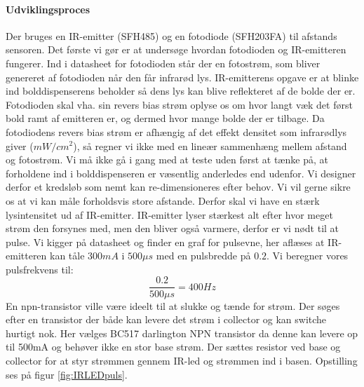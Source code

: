 \documentclass[Rapport/Rapport_main.tex]{subfiles}
\begin{document}
\paragraph{Udviklingsproces}
\newline\newline
Der bruges en IR-emitter (SFH485) og en fotodiode (SFH203FA) til afstands sensoren. Det første vi gør er at undersøge hvordan fotodioden og IR-emitteren fungerer. Ind i datasheet for fotodioden står der en fotostrøm, som bliver genereret af fotodioden når den får infrarød lys. IR-emitterens opgave er at blinke ind bolddispenserens beholder så dens lys kan blive reflekteret af de bolde der er. Fotodioden skal vha. sin revers bias strøm oplyse os om hvor langt væk det først bold ramt af emitteren er, og dermed hvor mange bolde der er tilbage. Da fotodiodens revers bias strøm er afhængig af det effekt densitet som infrarødlys giver ($mW/cm^2$), så regner vi ikke med en lineær sammenhæng mellem afstand og fotostrøm.
Vi må ikke gå i gang med at teste uden først at tænke på, at forholdene ind i bolddispenseren er væsentlig anderledes end udenfor. Vi designer derfor et kredsløb som nemt kan re-dimensioneres efter behov. Vi vil gerne sikre os at vi kan måle forholdsvis store afstande. Derfor skal vi have en stærk lysintensitet ud af IR-emitter. IR-emitter lyser stærkest alt efter hvor meget strøm den forsynes med, men den bliver også varmere, derfor er vi nødt til at pulse. Vi kigger på datasheet og finder en graf for pulsevne, her aflæses at IR-emitteren kan tåle $300mA$ i $500\mu s$ med en pulsbredde på $0.2$. Vi beregner vores pulsfrekvens til:
\[\frac{0.2}{500\mu s}=400Hz\]
En npn-transistor ville være ideelt til at slukke og tænde for strøm. Der søges efter en transistor der både kan levere det strøm i collector og kan switche hurtigt nok. Her vælges BC517 darlington NPN transistor da denne kan levere op til 500mA og behøver ikke en stor base strøm. Der sættes resistor ved base og collector for at styr strømmen gennem IR-led og strømmen ind i basen. Opstilling ses på figur \ref{fig:IRLEDpuls}.
\end{document}
